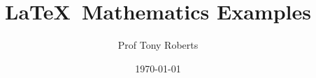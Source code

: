\documentclass[12pt,A4 paper]{article}
\title{\LaTeX\ Mathematics Examples}
\author{Prof Tony Roberts}
\date{\today}
\begin{document}
	\begin{titlepage}
	\maketitle
	\end{titlepage}
\end{document}
